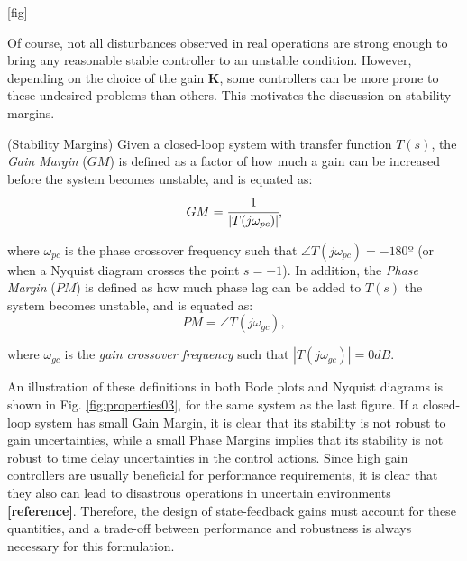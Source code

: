 \documentclass[a4paper,11pt]{book}
\numberwithin{figure}{chapter}
\numberwithin{equation}{chapter}
\numberwithin{table}{chapter}
\theoremstyle{definition}
\newtheorem{definition}{Definition}[chapter]
\newcounter{boxed-theorem}
\newcounter{boxed-definition}
\newenvironment{boxed-definition}[1]
{\begin{shaded} \begin{definition}{#1}}
{\end{definition} \end{shaded}}
\begin{document}
[fig]

Of course, not all disturbances observed in real operations are strong enough to bring any reasonable stable controller to an unstable condition. However, depending on the choice of the gain $\bm{K}$, some controllers can be more prone to these undesired problems than others. This motivates the discussion on stability margins.

\begin{boxed-definition}{(Stability Margins)}
    Given a closed-loop system with transfer function $T(s)$, the \textit{Gain Margin} ($GM$) is defined as a factor of how much a gain can be increased before the system becomes unstable, and is equated as:
    \begin{equation}
        GM = \cfrac{1}{|T(j \omega_{pc})|}
    ,\end{equation}
    
    \noindent where $\omega_{pc}$ is the phase crossover frequency such that $\angle T(j\omega_{pc}) = -180º$ (or when a Nyquist diagram crosses the point $s = -1$). In addition, the \textit{Phase Margin} ($PM$) is defined as how much phase lag can be added to $T(s)$ the system becomes unstable, and is equated as:
    \begin{equation}
        PM = \angle T(j \omega_{gc})
    ,\end{equation}
    
    \noindent where $\omega_{gc}$ is the \textit{gain crossover frequency} such that $| T(j\omega_{gc}) | = 0 dB$. 
\end{boxed-definition}

An illustration of these definitions in both Bode plots and Nyquist diagrams is shown in Fig. \ref{fig:properties03}, for the same system as the last figure. If a closed-loop system has small Gain Margin, it is clear that its stability is not robust to gain uncertainties, while a small Phase Margins implies that its stability is not robust to time delay uncertainties in the control actions. Since high gain controllers are usually beneficial for performance requirements, it is clear that they also can lead to disastrous operations in uncertain environments \textbf{[reference]}. Therefore, the design of state-feedback gains must account for these quantities, and a trade-off between performance and robustness is always necessary for this formulation. 


    
\end{document}
